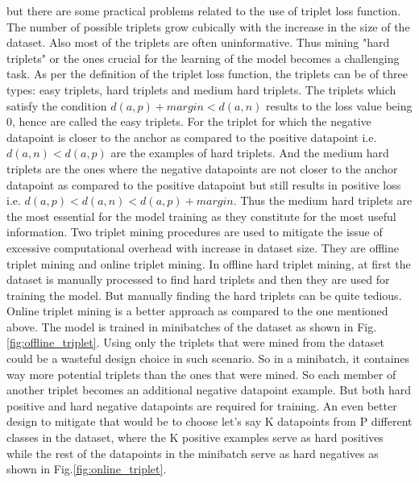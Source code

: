 but there are some practical problems related to the use of triplet loss function. The number of possible triplets grow cubically with the increase in the size of the dataset. Also most of the triplets are often uninformative. Thus mining "hard triplets" or the ones crucial for the learning of the model becomes a challenging task. As per the definition of the triplet loss function, the triplets can be of three types: easy triplets, hard triplets and medium hard triplets. The triplets which satisfy the condition $d(a,p)+margin<d(a,n)$ results to the loss value being 0, hence are called the easy triplets. For the triplet for which the negative datapoint is closer to the anchor as compared to the positive datapoint i.e. $d(a,n)<d(a,p)$ are the examples of hard triplets. And the medium hard triplets are the ones where the negative datapoints are not closer to the anchor datapoint as compared to the positive datapoint but still results in positive loss i.e. $d(a,p)<d(a,n)<d(a,p)+margin$. Thus the medium hard triplets are the most essential for the model training as they constitute for the most useful information. Two triplet mining procedures are used to mitigate the issue of excessive computational overhead with increase in dataset size. They are offline triplet mining and online triplet mining. In offline hard triplet mining, at first the dataset is manually processed to find hard triplets and then they are used for training the model. But manually finding the hard triplets can be quite tedious. Online triplet mining is a better approach as compared to the one mentioned above. The model is trained in minibatches of the dataset as shown in Fig.\ref*{fig:offline_triplet}. Using only the triplets that were mined from the dataset could be a wasteful design choice in such scenario. So in a minibatch, it containes way more potential triplets than the ones that were mined. So each member of another triplet becomes an additional negative datapoint example. But both hard positive and hard negative datapoints are required for training. An even better design to mitigate that would be to choose let's say K datapoints from P different classes in the dataset, where the K positive examples serve as hard positives while the rest of the datapoints in the minibatch serve as hard negatives as shown in Fig.\ref*{fig:online_triplet}.
